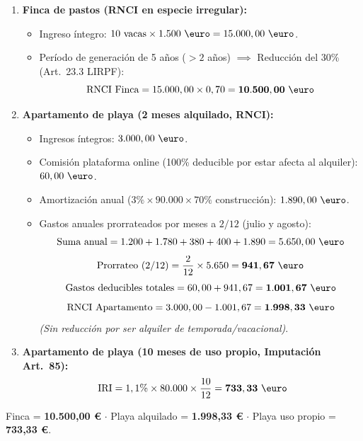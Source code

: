 \documentclass[11pt,a4paper,openany]{article}
\begin{document}
\begin{solucionBox}
\begin{enumerate}[label=\alph*.]
    \item \textbf{Finca de pastos (RNCI en especie irregular):}
    \begin{itemize}
        \item Ingreso íntegro: $10\text{ vacas} \times 1.500\text{ \euro} = 15.000,00\text{ \euro}$.
        \item Período de generación de 5 años ($>2$ años) $\implies$ Reducción del 30\% (Art.~23.3 LIRPF):
        $$\mathbf{\text{RNCI Finca}} = 15.000,00 \times 0,70 = \mathbf{10.500,00\text{ \euro}}$$
    \end{itemize}

    \item \textbf{Apartamento de playa (2 meses alquilado, RNCI):}
    \begin{itemize}
        \item Ingresos íntegros: $3.000,00\text{ \euro}$.
        \item Comisión plataforma online (100\% deducible por estar afecta al alquiler): $60,00\text{ \euro}$.
        \item Amortización anual ($3\% \times 90.000 \times 70\%$ construcción): $1.890,00\text{ \euro}$.
        \item Gastos anuales prorrateados por meses a $2/12$ (julio y agosto):
        $$\text{Suma anual} = 1.200 + 1.780 + 380 + 400 + 1.890 = 5.650,00\text{ \euro}$$
        $$\text{Prorrateo } (2/12) = \frac{2}{12} \times 5.650 = \mathbf{941,67\text{ \euro}}$$
        $$\text{Gastos deducibles totales} = 60,00 + 941,67 = \mathbf{1.001,67\text{ \euro}}$$
        $$\mathbf{\text{RNCI Apartamento}} = 3.000,00 - 1.001,67 = \mathbf{1.998,33\text{ \euro}}$$
        \textit{(Sin reducción por ser alquiler de temporada/vacacional)}.
    \end{itemize}

    \item \textbf{Apartamento de playa (10 meses de uso propio, Imputación Art.~85):}
    $$\mathbf{\text{IRI}} = 1,1\% \times 80.000 \times \frac{10}{12} = \mathbf{733,33\text{ \euro}}$$
\end{enumerate}
\end{solucionBox}

\begin{resultadoBox}
Finca = \textbf{10.500,00 \euro} $\cdot$ Playa alquilado = \textbf{1.998,33 \euro} $\cdot$ Playa uso propio = \textbf{733,33 \euro}.
\end{resultadoBox}
\end{document}
